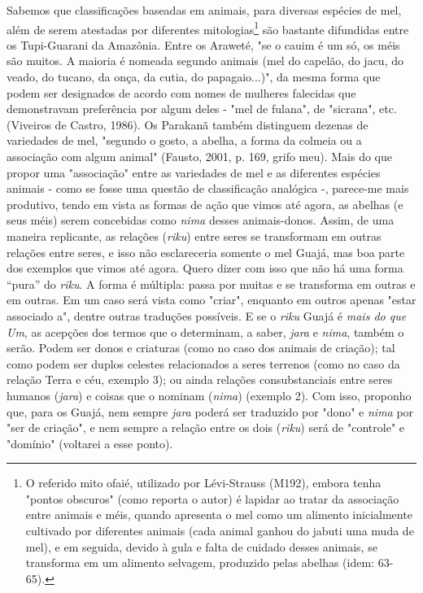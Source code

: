 Sabemos que classificações baseadas em animais, para diversas espécies
de mel, além de serem atestadas por diferentes mitologias\footnote{O
  referido mito ofaié, utilizado por Lévi-Strauss (M192), embora tenha
  "pontos obscuros" (como reporta o autor) é lapidar ao tratar da
  associação entre animais e méis, quando apresenta o mel como um
  alimento inicialmente cultivado por diferentes animais (cada animal
  ganhou do jabuti uma muda de mel), e em seguida, devido à gula e falta
  de cuidado desses animais, se transforma em um alimento selvagem,
  produzido pelas abelhas (idem: 63-65).} são bastante difundidas entre
os Tupi-Guarani da Amazônia. Entre os Araweté, "se o cauim é um só, os
méis são muitos. A maioria é nomeada segundo animais (mel do capelão, do
jacu, do veado, do tucano, da onça, da cutia, do papagaio...)", da mesma
forma que podem ser designados de acordo com nomes de mulheres falecidas
que demonstravam preferência por algum deles - "mel de fulana", de
"sicrana", etc. (Viveiros de Castro, 1986). Os Parakanã também
distinguem dezenas de variedades de mel, "segundo o gosto, a abelha, a
forma da colmeia ou a associação com algum animal" (Fausto, 2001, p.
169, grifo meu). Mais do que propor uma "associação" entre as variedades
de mel e as diferentes espécies animais - como se fosse uma questão de
classificação analógica -, parece-me mais produtivo, tendo em vista as
formas de ação que vimos até agora, as abelhas (e seus méis) serem
concebidas como \emph{nima} desses animais-donos. Assim, de uma maneira
replicante, as relações (\emph{riku}) entre seres se transformam em
outras relações entre seres, e isso não esclareceria somente o mel
Guajá, mas boa parte dos exemplos que vimos até agora. Quero dizer com
isso que não há uma forma ``pura'' do \emph{riku}. A forma é múltipla:
passa por muitas e se transforma em outras e em outras. Em um caso será
vista como "criar", enquanto em outros apenas "estar associado a",
dentre outras traduções possíveis. E se o \emph{riku} Guajá é \emph{mais
do que} \emph{Um}, as acepções dos termos que o determinam, a saber,
\emph{jara} e \emph{nima}, também o serão. Podem ser donos e criaturas
(como no caso dos animais de criação); tal como podem ser duplos
celestes relacionados a seres terrenos (como no caso da relação Terra e
céu, exemplo 3); ou ainda relações consubstanciais entre seres humanos
(\emph{jara}) e coisas que o nominam (\emph{nima}) (exemplo 2). Com
isso, proponho que, para os Guajá, nem sempre \emph{jara} poderá ser
traduzido por "dono" e \emph{nima} por "ser de criação", e nem sempre a
relação entre os dois (\emph{riku}) será de "controle" e "domínio"
(voltarei a esse ponto).

